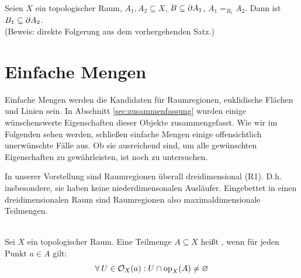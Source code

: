     \begin{kor}\ \\ 
        Seien $X$ ein topologischer Raum, $A_1, A_2 \subseteq X$, $B \subseteq \partial A_1$, $A_1 =_{B_1} A_2$. Dann ist $B_1 \subseteq \partial A_2$.\\
        (Beweis: direkte Folgerung aus dem vorhergehenden Satz.)
    \end{kor}



    
    

\section{Einfache Mengen}\label{sec:einf-mengen}
% 
% 

Einfache Mengen werden die Kandidaten für Raumregionen, euklidische Flächen und Linien sein.
In Abschnitt \ref{sec:zusammenfassung} wurden einige wünschenswerte Eigenschaften dieser Objekte zusammengefasst.
Wie wir im Folgenden sehen werden, schließen einfache Mengen einige offensichtlich unerwünschte Fälle aus. 
Ob sie ausreichend sind, um alle gewünschten Eigenschaften zu gewährleisten, ist noch zu untersuchen.

In
unserer Vorstellung sind Raumregionen überall dreidimensional (R1). D.h. insbesondere, sie haben keine \glqq niederdimensonalen Ausläufer\grqq.
Eingebettet in einen dreidimensionalen Raum sind Raumregionen also maximaldimensionale Teilmengen.

    \begin{dfn}[Maximaldimensional]\label{def:maxdim}\ \\
        Sei $X$ ein topologischer Raum. Eine Teilmenge $A \subseteq X$ heißt , wenn für jeden Punkt $a \in A$ gilt:
        $$\forall\: U \in \mathcal{O}_X(a) : U \cap \text{op}_X(A) \neq \varnothing$$ 
    \end{dfn}
    
